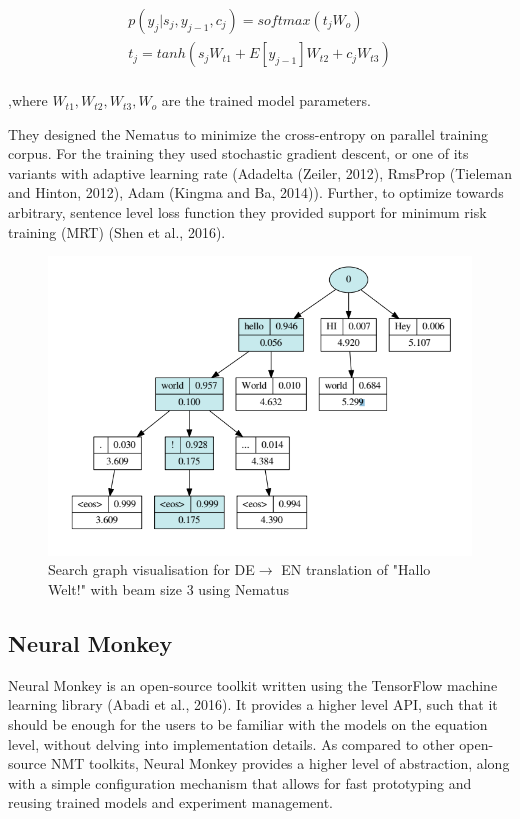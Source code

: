 \begin{align*}
p(y_j|s_j , y_{j-1}, c_j ) = softmax (t_jW_o)\\
t_j=tanh (s_jW_{t1} + E[y_{j-1}]W_{t2} + c_jW_{t3}) \\
\end{align*}

,where $W_{t1},W_{t2},W_{t3},W_o$ are the trained model parameters.

They designed the Nematus to minimize the cross-entropy on parallel training corpus. For the training they used stochastic gradient descent, or one of its variants with adaptive learning rate (Adadelta (Zeiler, 2012), RmsProp (Tieleman and Hinton, 2012), Adam (Kingma and Ba, 2014)). Further, to optimize towards arbitrary, sentence level loss function they provided support for minimum risk training (MRT) (Shen et al., 2016). 

\begin{figure}
\includegraphics[width=\textwidth]{figures/nematus.png}
\caption{ Search graph visualisation for DE$\rightarrow$ EN
translation of "Hallo Welt!" with beam size 3 using Nematus} \label{fignm2}
\end{figure}

\subsection{Neural Monkey}
Neural Monkey is an open-source toolkit written using the TensorFlow machine learning library (Abadi et al., 2016). It provides a higher level API, such that it should be enough for the users to be familiar with the models on the equation level, without delving into implementation details. As compared to other open-source NMT toolkits, Neural Monkey provides a higher level of abstraction, along with a simple configuration mechanism that allows for fast prototyping and reusing trained models and experiment management.

